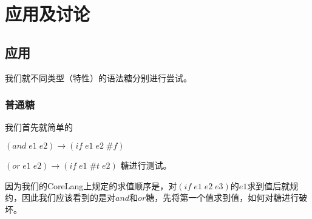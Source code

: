 \pagestyle{fancy}
\normalsize
\linespread{1.5}\selectfont
\label{mark:chapter4}\chapter{应用及讨论}



\section{应用}
我们就不同类型（特性）的语法糖分别进行尝试。

\subsection{普通糖}

我们首先就简单的

$(and\;e1\;e2)→(if\;e1\;e2\;\#f)$

$(or\;e1\;e2)→(if\;e1\;\#t\;e2)$
糖进行测试。

因为我们的CoreLang上规定的求值顺序是，对$(if \;e1\;e2\;e3)$的$e1$求到值后就规约，因此我们应该看到的是对$and$和$or$糖，先将第一个值求到值，如何对糖进行破坏。

\begin{center}
\end{center}

\begin{center}
\end{center}


